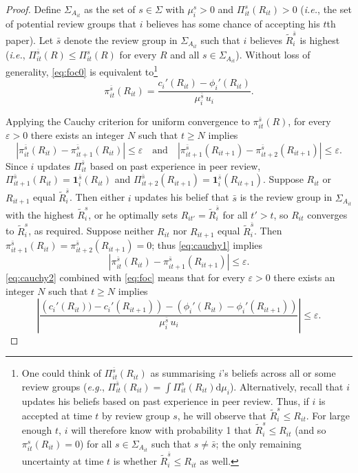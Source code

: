 \begin{proof}
	Define $\Sigma_{A_{it}}$ as the set of $s\in\Sigma$ with $\mu_i^s>0$ and $\Pi_{it}^s(R_{it})>0$ (\textit{i.e.}, the set of potential review groups that $i$ believes has some chance of accepting his $t$th paper). Let $\bar s$ denote the review group in $\Sigma_{A_{it}}$ such that $i$ believes $\widetilde R_i^{\bar s}$ is highest (\textit{i.e.}, $\Pi_{it}^{\bar s}(R)\le\Pi_{it}^s(R)$ for every $R$ and all $s\in\Sigma_{A_{it}}$). Without loss of generality, \autoref{eq:foc0} is equivalent to\footnote{One could think of $\Pi_{it}^{\bar s}(R_{it})$ as summarising $i$'s beliefs across all or some review groups (\textit{e.g.}, $\Pi_{it}^{\bar s}(R_{it})=\int\Pi_{it}^s(R_{it})\mathrm d\mu_i$). Alternatively, recall that $i$ updates his beliefs based on past experience in peer review. Thus, if $i$ is accepted at time $t$ by review group $s$, he will observe that $\widetilde R_i^s\le R_{it}$. For large enough $t$, $i$ will therefore know with probability 1 that $\widetilde R_i^s\le R_{it}$ (and so $\pi_{it}^{s}(R_{it})=0$) for all $s\in\Sigma_{A_{it}}$ such that $s\neq\bar s$; the only remaining uncertainty at time $t$ is whether $\widetilde R_i^{\bar s}\le R_{it}$ as well.} 
	\begin{equation}
		\pi_{it}^{\bar s}(R_{it})=\frac{c_i'(R_{it})-\phi_i'(R_{it})}{\mu_i^{\bar s}\,u_i}.
		\label{eq:foc}
	\end{equation}
	
	Applying the Cauchy criterion for uniform convergence to $\pi_{it}^{\bar s}(R)$, for every $\varepsilon>0$ there exists an integer $N$ such that $t\ge N$ implies
	\begin{equation}
		\left|\pi_{it}^{\bar s}(R_{it})-\pi_{it+1}^{\bar s}(R_{it})\right|\le\varepsilon\quad\text{and}\quad\left|\pi_{it+1}^{\bar s}(R_{it+1})-\pi_{it+2}^{\bar s}(R_{it+1})\right|\le\varepsilon.
		\label{eq:cauchy1}
	\end{equation}
	Since $i$ updates $\Pi_{it}^{\bar s}$ based on past experience in peer review, $\Pi_{it+1}^{\bar s}(R_{it})=\bm1_i^{\bar s}(R_{it})$ and $\Pi_{it+2}^{\bar s}(R_{it+1})=\bm1_i^{\bar s}(R_{it+1})$. Suppose $R_{it}$ or $R_{it+1}$ equal $\widetilde R_i^{\bar s}$. Then either $i$ updates his belief that $\bar s$ is the review group in $\Sigma_{A_{it}}$ with the highest $\widetilde R_i^s$, or he optimally sets $R_{it'}=\widetilde R_i^{\bar s}$ for all $t'>t$, so $R_{it}$ converges to $\widetilde R_i^s$, as required. Suppose neither $R_{it}$ nor $R_{it+1}$ equal $\widetilde R_i^{\bar s}$. Then $\pi_{it+1}^{\bar s}(R_{it})=\pi_{it+2}^{\bar s}(R_{it+1})=0$; thus \autoref{eq:cauchy1} implies
	\begin{equation}
		\left|\pi_{it}^{\bar s}(R_{it})-\pi_{it+1}^{\bar s}(R_{it+1})\right|\le\varepsilon.
		\label{eq:cauchy2}
	\end{equation}
	\autoref{eq:cauchy2} combined with \autoref{eq:foc} means that for every $\varepsilon>0$ there exists an integer $N$ such that $t\ge N$ implies
	\begin{equation}
		\left|\frac{\left(c_i'(R_{it}))-c_i'(R_{it+1})\right)-\left(\phi_i'(R_{it})-\phi_i'(R_{it+1})\right)}{\mu_i^{\bar s}\,u_i}\right|\le\varepsilon.
		\label{eq:cauchy3}
	\end{equation}


\end{proof}
